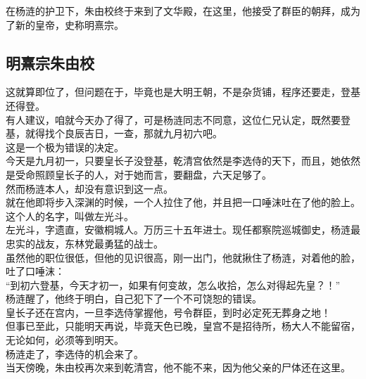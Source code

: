 \begin{multicols}{\theparacolNo}
在杨涟的护卫下，朱由校终于来到了文华殿，在这里，他接受了群臣的朝拜，成为了新的皇帝，史称明熹宗。\\

\subsection{明熹宗朱由校}
这就算即位了，但问题在于，毕竟也是大明王朝，不是杂货铺，程序还要走，登基还得登。\\

有人建议，咱就今天办了得了，可是杨涟同志不同意，这位仁兄认定，既然要登基，就得找个良辰吉日，一查，那就九月初六吧。\\

这是一个极为错误的决定。\\

今天是九月初一，只要皇长子没登基，乾清宫依然是李选侍的天下，而且，她依然是受命照顾皇长子的人，对于她而言，要翻盘，六天足够了。\\

然而杨涟本人，却没有意识到这一点。\\

就在他即将步入深渊的时候，一个人拉住了他，并且把一口唾沫吐在了他的脸上。\\

这个人的名字，叫做左光斗。\\

左光斗，字遗直，安徽桐城人。万历三十五年进士。现任都察院巡城御史，杨涟最忠实的战友，东林党最勇猛的战士。\\

虽然他的职位很低，但他的见识很高，刚一出门，他就揪住了杨涟，对着他的脸，吐了口唾沫：\\

“到初六登基，今天才初一，如果有何变故，怎么收拾，怎么对得起先皇？！”\\

杨涟醒了，他终于明白，自己犯下了一个不可饶恕的错误。\\

皇长子还在宫内，一旦李选侍掌握他，号令群臣，到时必定死无葬身之地！\\

但事已至此，只能明天再说，毕竟天色已晚，皇宫不是招待所，杨大人不能留宿，无论如何，必须等到明天。\\

杨涟走了，李选侍的机会来了。\\

当天傍晚，朱由校再次来到乾清宫，他不能不来，因为他父亲的尸体还在这里。\\


\end{multicols}
